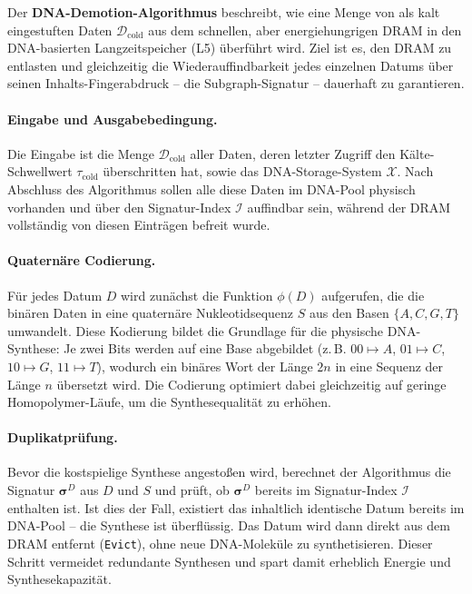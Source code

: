 ﻿\documentclass[a4paper,12pt]{article}
\theoremstyle{definition}
\begin{document}
Der \textbf{DNA-Demotion-Algorithmus} beschreibt, wie eine Menge von als kalt eingestuften Daten $\mathcal{D}_{\mathrm{cold}}$ aus dem schnellen, aber energiehungrigen DRAM in den DNA-basierten Langzeitspeicher (L5) überführt wird. Ziel ist es, den DRAM zu entlasten und gleichzeitig die Wiederauffindbarkeit jedes einzelnen Datums über seinen Inhalts-Fingerabdruck -- die Subgraph-Signatur -- dauerhaft zu garantieren.

\paragraph{Eingabe und Ausgabebedingung.}
Die Eingabe ist die Menge $\mathcal{D}_{\mathrm{cold}}$ aller Daten, deren letzter Zugriff den Kälte-Schwellwert $\tau_{\mathrm{cold}}$ überschritten hat, sowie das DNA-Storage-System $\mathcal{X}$. Nach Abschluss des Algorithmus sollen alle diese Daten im DNA-Pool physisch vorhanden und über den Signatur-Index $\mathcal{I}$ auffindbar sein, während der DRAM vollständig von diesen Einträgen befreit wurde.

\paragraph{Quaternäre Codierung.}
Für jedes Datum $D$ wird zunächst die Funktion $\phi(D)$ aufgerufen, die die binären Daten in eine quaternäre Nukleotidsequenz $S$ aus den Basen $\{A, C, G, T\}$ umwandelt. Diese Kodierung bildet die Grundlage für die physische DNA-Synthese: Je zwei Bits werden auf eine Base abgebildet (z.\,B. $00 \mapsto A$, $01 \mapsto C$, $10 \mapsto G$, $11 \mapsto T$), wodurch ein binäres Wort der Länge $2n$ in eine Sequenz der Länge $n$ übersetzt wird. Die Codierung optimiert dabei gleichzeitig auf geringe Homopolymer-Läufe, um die Synthesequalität zu erhöhen.

\paragraph{Duplikatprüfung.}
Bevor die kostspielige Synthese angestoßen wird, berechnet der Algorithmus die Signatur $\boldsymbol{\sigma}^D$ aus $D$ und $S$ und prüft, ob $\boldsymbol{\sigma}^D$ bereits im Signatur-Index $\mathcal{I}$ enthalten ist. Ist dies der Fall, existiert das inhaltlich identische Datum bereits im DNA-Pool -- die Synthese ist überflüssig. Das Datum wird dann direkt aus dem DRAM entfernt (\texttt{Evict}), ohne neue DNA-Moleküle zu synthetisieren. Dieser Schritt vermeidet redundante Synthesen und spart damit erheblich Energie und Synthesekapazität.
\end{document}
